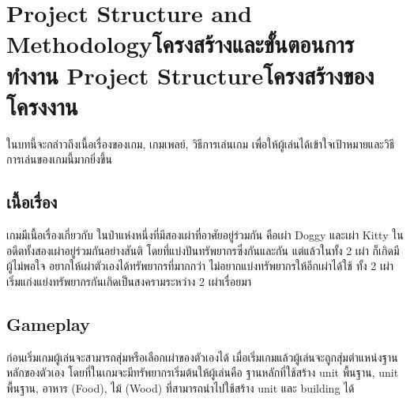\chapter{\ifproject%
\ifenglish Project Structure and Methodology\else โครงสร้างและขั้นตอนการทำงาน\fi
\else%
\ifenglish Project Structure\else โครงสร้างของโครงงาน\fi
\fi}

\qquad ในบทนี้จะกล่าวถึงเนื้อเรื่องของเกม, เกมเพลย์, วิธีการเล่นเกม เพื่อให้ผู้เล่นได้เข้าใจเป้าหมายและวิธีการเล่นของเกมนี้มากยิ่งขึ้น




\section{เนื้อเรื่อง}

\qquad เกมมีเนื้อเรื่องเกี่ยวกับ ในป่าแห่งหนึ่งที่มีสองเผ่าที่อาศัยอยู่ร่วมกัน คือเผ่า Doggy และเผ่า Kitty ในอดีตทั้งสองเผ่าอยู่ร่วมกันอย่างสันติ โดยที่แบ่งปันทรัพยากรซึ่งกันและกัน 
แต่แล้วในทั้ง 2 เผ่า ก็เกิดมีผู้ไม่พอใจ อยากให้เผ่าตัวเองได้ทรัพยากรที่มากกว่า ไม่อยากแบ่งทรัพยากรให้อีกเผ่าได้ใช้ ทั้ง 2 เผ่าเริ่มแก่งแย่งทรัพยากรกันเกิดเป็นสงครามระหว่าง 2 เผ่าเรื่อยมา

\section{Gameplay}

\qquad ก่อนเริ่มเกมผู้เล่นจะสามารถสุ่มหรือเลือกเผ่าของตัวเองได้ เมื่อเริ่มเกมแล้วผู้เล่นจะถูกสุ่มตําแหน่งฐานหลักของตัวเอง 
โดยที่ในเกมจะมีทรัพยากรเริ่มต้นให้ผู้เล่นคือ ฐานหลักที่ใช้สร้าง unit พื้นฐาน, unit พื้นฐาน, อาหาร (Food), ไม้ (Wood) 
ที่สามารถนําไปใช้สร้าง unit และ building ได้

